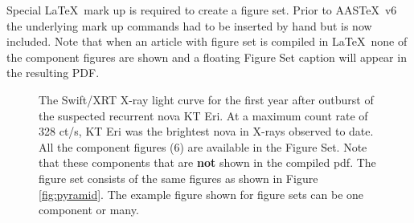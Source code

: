 \documentclass[linenumbers]{aastex631}
\newcommand\aastex{AAS\TeX}
\newcommand\latex{La\TeX}
\begin{document}
Special \latex\ mark up is required to create a figure set.  Prior to
\aastex\ v6 the underlying mark up commands had to be inserted by hand
but is now included.  Note that when an article with figure set is compiled
in \latex\ none of the component figures are shown and a floating Figure
Set caption will appear in the resulting PDF.

\figsetstart
{}

\figsetgrpstart
{}
\figsetgrpend

\figsetgrpstart
{}
\figsetgrpend

\figsetgrpstart
{}
\figsetgrpend

\figsetgrpstart
{}
\figsetgrpend

\figsetgrpstart
{}
\figsetgrpend

\figsetgrpstart
{}
\figsetgrpend

\figsetend

\begin{figure}
\caption{The Swift/XRT X-ray light curve for the first year after
outburst of the suspected recurrent nova KT Eri. At a maximum count rate of 
328 ct/s, KT Eri was the brightest nova in X-rays observed to date. All 
the component figures (6) are available in the Figure Set. Note that
these components that are {\bf not} shown in the compiled pdf. The figure
set consists of the same figures as shown in Figure \ref{fig:pyramid}. 
The example figure shown for figure sets can be one component or many. 
\label{fig:fig4}}
\end{figure}
\end{document}
